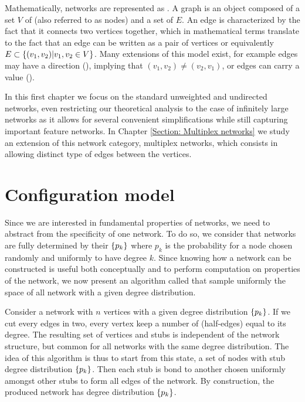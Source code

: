 \documentclass[
11pt, %
english, %
singlespacing, %
nolistspacing, %
liststotoc, %
headsepline, %
]{MastersDoctoralThesis} %
\begin{document}
Mathematically, networks are represented as . A graph is an object composed of a set $V$ of  (also referred to as nodes) and a set of  $E$. An edge is characterized by the fact that it connects two vertices together, which in mathematical terms translate to the fact that an edge can be written as a pair of vertices or equivalently $E \subset \{(v_1, v_2) | v_1, v_2 \in V \}$. Many extensions of this model exist, for example edges may have a direction (), implying that $(v_1, v_2) \neq (v_2, v_1)$, or edges can carry a value ().

In this first chapter we focus on the standard unweighted and undirected networks, even restricting our theoretical analysis to the case of infinitely large networks as it allows for several convenient simplifications while still capturing important feature networks. In Chapter \ref{Section: Multiplex networks} we study an extension of this network category, multiplex networks, which consists in allowing distinct type of edges between the vertices.

\section{Configuration model}
\label{Section: Configuration model}

Since we are interested in fundamental properties of networks, we need to abstract from the specificity of one network. To do so, we consider that networks are fully determined by their  $\{p_k\}$ where $p_k$ is the probability for a node chosen randomly and uniformly to have degree $k$. Since knowing how a network can be constructed is useful both conceptually and to perform computation on properties of the network, we now present an algorithm called  \cite{newman2010networks} that sample uniformly the space of all network with a given degree distribution.

Consider a network with $n$ vertices with a given degree distribution $\{p_k\}$. If we cut every edges in two, every vertex keep a number of  (half-edges) equal to its degree. The resulting set of vertices and stubs is independent of the network structure, but common for all networks with the same degree distribution. The idea of this algorithm is thus to start from this state, a set of nodes with stub degree distribution $\{p_k\}$. Then each stub is bond to another chosen uniformly amongst other stubs to form all edges of the network. By construction, the produced network has degree distribution $\{p_k\}$.
\end{document}
